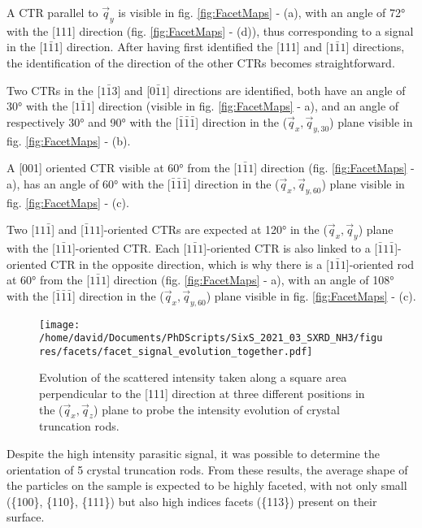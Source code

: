 A CTR parallel to $\vec{q}_y$ is visible in fig. \ref{fig:FacetMaps} - (a), with an angle of \ang{72} with the [111] direction (fig. \ref{fig:FacetMaps} - (d)), thus corresponding to a signal in the [1$\bar{1}$1] direction.
After having first identified the [111] and [$1\bar{1}1$] directions, the identification of the direction of the other CTRs becomes straightforward.

Two CTRs in the [$1\bar{1}3$] and [$0\bar{1}1$] directions are identified, both have an angle of \ang{30} with the [$1\bar{1}1$] direction (visible in  fig. \ref{fig:FacetMaps} - a), and an angle of respectively \ang{30} and \ang{90} with the [$\bar{1}\bar{1}\bar{1}$] direction in the ($\vec{q}_x, \vec{q}_{y, 30}$) plane visible in fig. \ref{fig:FacetMaps} - (b).

A [001] oriented CTR visible at \ang{60} from the [$1\bar{1}1$] direction (fig. \ref{fig:FacetMaps} - a), has an angle of \ang{60} with the [$\bar{1}\bar{1}\bar{1}$] direction in the ($\vec{q}_x, \vec{q}_{y, 60}$) plane visible in fig. \ref{fig:FacetMaps} - (c).

Two [$11\bar{1}$] and [$\bar{1}11$]-oriented CTRs are expected at \ang{120} in the ($\vec{q}_x, \vec{q}_y$) plane with the [$1\bar{1}1$]-oriented CTR.
Each [$1\bar{1}1$]-oriented CTR is also linked to a [$\bar{1}1\bar{1}$]-oriented CTR in the opposite direction, which is why there is a [$1\bar{1}1$]-oriented rod at \ang{60} from the [$1\bar{1}1$] direction (fig. \ref{fig:FacetMaps} - a), with an angle of \ang{108} with the [$\bar{1}\bar{1}\bar{1}$] direction in the ($\vec{q}_x, \vec{q}_{y, 60}$) plane visible in fig. \ref{fig:FacetMaps} - (c).

\begin{figure}[!htb]
    \centering
    \texttt{[image: /home/david/Documents/PhDScripts/SixS\_2021\_03\_SXRD\_NH3/figures/facets/facet\_signal\_evolution\_together.pdf]}
    \caption{
    Evolution of the scattered intensity taken along a square area perpendicular to the [111] direction at three different positions in the ($\vec{q}_x, \vec{q}_z$) plane to probe the intensity evolution of crystal truncation rods.
    }
    \label{fig:FacetSignal}
\end{figure}

Despite the high intensity parasitic signal, it was possible to determine the orientation of 5 crystal truncation rods.
From these results, the average shape of the particles on the sample is expected to be highly faceted, with not only small (\{100\}, \{110\}, \{111\}) but also high indices facets (\{113\}) present on their surface.

